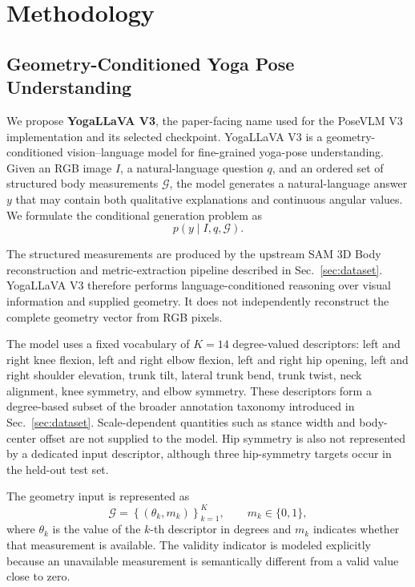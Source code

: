 \section{Methodology}
\label{sec:methodology}

\subsection{Geometry-Conditioned Yoga Pose Understanding}
\label{sec:method_overview}

We propose \textbf{YogaLLaVA V3}, the paper-facing name used for the
PoseVLM V3 implementation and its selected checkpoint. YogaLLaVA V3 is
a geometry-conditioned vision--language model for fine-grained yoga-pose
understanding. Given an RGB image $I$, a natural-language question $q$,
and an ordered set of structured body measurements $\mathcal{G}$, the
model generates a natural-language answer $y$ that may contain both
qualitative explanations and continuous angular values. We formulate
the conditional generation problem as
\begin{equation}
    p(y \mid I,q,\mathcal{G}).
    \label{eq:problem_formulation}
\end{equation}

The structured measurements are produced by the upstream SAM 3D Body
reconstruction and metric-extraction pipeline described in
Sec.~\ref{sec:dataset}. YogaLLaVA V3 therefore performs
language-conditioned reasoning over visual information and supplied
geometry. It does not independently reconstruct the complete geometry
vector from RGB pixels.

The model uses a fixed vocabulary of $K=14$ degree-valued descriptors:
left and right knee flexion, left and right elbow flexion, left and
right hip opening, left and right shoulder elevation, trunk tilt,
lateral trunk bend, trunk twist, neck alignment, knee symmetry, and
elbow symmetry. These descriptors form a degree-based subset of the
broader annotation taxonomy introduced in Sec.~\ref{sec:dataset}.
Scale-dependent quantities such as stance width and body-center offset
are not supplied to the model. Hip symmetry is also not represented by
a dedicated input descriptor, although three hip-symmetry targets occur
in the held-out test set.

The geometry input is represented as
\begin{equation}
    \mathcal{G}
    =
    \left\{
        \left(\theta_k,m_k\right)
    \right\}_{k=1}^{K},
    \qquad
    m_k\in\{0,1\},
    \label{eq:geometry_input}
\end{equation}
where $\theta_k$ is the value of the $k$-th descriptor in degrees and
$m_k$ indicates whether that measurement is available. The validity
indicator is modeled explicitly because an unavailable measurement is
semantically different from a valid value close to zero.

